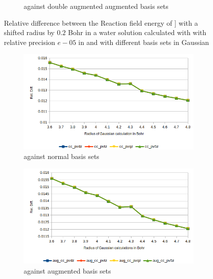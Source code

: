 \documentclass[../master_thesis.tex]{subfiles}
\begin{document}
\begin{figure}[h!]
\begin{subfigure}[b]{0.75\linewidth}
    \caption{\mrchem against double augmented augmented basis sets}
  \end{subfigure}
  \caption[Relative difference between methods for  with radius $+0.2$ Bohr]{Relative difference between the Reaction field energy of ] with a shifted radius by $0.2$ Bohr in a water solution calculated with with relative precision $e-05$ in \mrchem
  and with different basis sets in Gaussian}
  \label{fig:watreldiff02}
\end{figure}

\begin{figure}[h!]
  \centering
  \begin{subfigure}[b]{0.75\linewidth}
    \includegraphics[width=\linewidth]{img/lipreldiff02.png}
    \caption{\mrchem against normal basis sets}
  \end{subfigure}
  \begin{subfigure}[b]{0.75\linewidth}
    \includegraphics[width=\linewidth]{img/lipaugreldiff02.png}
    \caption{\mrchem against augmented basis sets}
  \end{subfigure}
  \begin{subfigure}[b]{0.75\linewidth}

\end{subfigure}
\end{figure}
\end{document}
